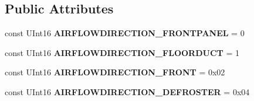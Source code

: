 \subsection*{Public Attributes}
\begin{DoxyCompactItemize}
\item 
\hypertarget{interfaceVehicle_1_1org_1_1automotive_1_1HVAC_ab1c3ad14d75cd95054c6d77b3cdb0454}{const U\-Int16 {\bfseries A\-I\-R\-F\-L\-O\-W\-D\-I\-R\-E\-C\-T\-I\-O\-N\-\_\-\-F\-R\-O\-N\-T\-P\-A\-N\-E\-L} = 0}\label{interfaceVehicle_1_1org_1_1automotive_1_1HVAC_ab1c3ad14d75cd95054c6d77b3cdb0454}

\item 
\hypertarget{interfaceVehicle_1_1org_1_1automotive_1_1HVAC_a008b79699c0548416dcba0c570a59799}{const U\-Int16 {\bfseries A\-I\-R\-F\-L\-O\-W\-D\-I\-R\-E\-C\-T\-I\-O\-N\-\_\-\-F\-L\-O\-O\-R\-D\-U\-C\-T} = 1}\label{interfaceVehicle_1_1org_1_1automotive_1_1HVAC_a008b79699c0548416dcba0c570a59799}

\item 
\hypertarget{interfaceVehicle_1_1org_1_1automotive_1_1HVAC_a1702011004ac8ccaab2a07c1dcb14929}{const U\-Int16 {\bfseries A\-I\-R\-F\-L\-O\-W\-D\-I\-R\-E\-C\-T\-I\-O\-N\-\_\-\-F\-R\-O\-N\-T} = 0x02}\label{interfaceVehicle_1_1org_1_1automotive_1_1HVAC_a1702011004ac8ccaab2a07c1dcb14929}

\item 
\hypertarget{interfaceVehicle_1_1org_1_1automotive_1_1HVAC_afd605a6186f5ba253200611be7aa645a}{const U\-Int16 {\bfseries A\-I\-R\-F\-L\-O\-W\-D\-I\-R\-E\-C\-T\-I\-O\-N\-\_\-\-D\-E\-F\-R\-O\-S\-T\-E\-R} = 0x04}\label{interfaceVehicle_1_1org_1_1automotive_1_1HVAC_afd605a6186f5ba253200611be7aa645a}


\end{DoxyCompactItemize}
